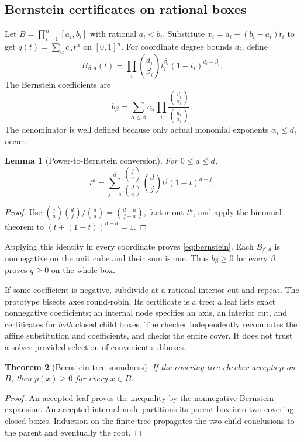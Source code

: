 \documentclass[11pt,letterpaper]{article}
\newtheorem{theorem}{Theorem}[section]
\newtheorem{lemma}[theorem]{Lemma}
\theoremstyle{definition}\newtheorem{definition}[theorem]{Definition}
\theoremstyle{remark}\newtheorem{remark}[theorem]{Remark}
\begin{document}
\subsection{Bernstein certificates on rational boxes}
Let $B=\prod_{i=1}^{n}[a_i,b_i]$ with rational $a_i<b_i$. Substitute
$x_i=a_i+(b_i-a_i)t_i$ to get
$q(t)=\sum_\alpha c_\alpha t^\alpha$ on $[0,1]^n$. For coordinate degree bounds $d_i$, define
\[
 B_{\beta,d}(t)=\prod_i\binom{d_i}{\beta_i}
 t_i^{\beta_i}(1-t_i)^{d_i-\beta_i}.
\]
The Bernstein coefficients are
\begin{equation}\label{eq:bernstein}
 b_\beta=\sum_{\alpha\le\beta}c_\alpha
       \prod_i\frac{\binom{\beta_i}{\alpha_i}}{\binom{d_i}{\alpha_i}}.
\end{equation}
The denominator is well defined because only actual monomial exponents $\alpha_i\le d_i$ occur.

\begin{lemma}[Power-to-Bernstein conversion]
For $0\le a\le d$,
\[
 t^a=\sum_{j=a}^{d}\frac{\binom{j}{a}}{\binom{d}{a}}
      \binom{d}{j}t^j(1-t)^{d-j}.
\]
\end{lemma}
\begin{proof}
Use $\binom{j}{a}\binom{d}{j}/\binom{d}{a}=\binom{d-a}{j-a}$, factor out $t^a$, and apply the binomial theorem to $(t+(1-t))^{d-a}=1$.
\end{proof}
Applying this identity in every coordinate proves \eqref{eq:bernstein}. Each $B_{\beta,d}$ is nonnegative on the unit cube and their sum is one. Thus $b_\beta\ge0$ for every $\beta$ proves $q\ge0$ on the whole box.

If some coefficient is negative, subdivide at a rational interior cut and repeat. The prototype bisects axes round-robin. Its certificate is a tree: a leaf lists exact nonnegative coefficients; an internal node specifies an axis, an interior cut, and certificates for \emph{both} closed child boxes. The checker independently recomputes the affine substitution and coefficients, and checks the entire cover. It does not trust a solver-provided selection of convenient subboxes.

\begin{theorem}[Bernstein tree soundness]
If the covering-tree checker accepts $p$ on $B$, then $p(x)\ge0$ for every $x\in B$.
\end{theorem}
\begin{proof}
An accepted leaf proves the inequality by the nonnegative Bernstein expansion. An accepted internal node partitions its parent box into two covering closed boxes. Induction on the finite tree propagates the two child conclusions to the parent and eventually the root.
\end{proof}
\end{document}
